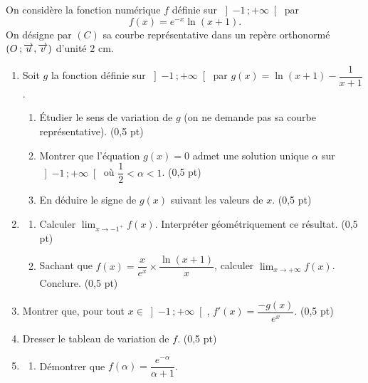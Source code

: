 \begin{commeaubac}
On considère la fonction numérique $f$ définie sur $\left]-1\,;+\infty\right[$
par
\[
  f(x) = e^{-x}\ln(x+1) .
\]
On désigne par $(C)$ sa courbe représentative dans un repère orthonormé
$(O\,;\overrightarrow{u},\overrightarrow{v})$ d'unité $2$ cm.

\begin{enumerate}[label=\textbf{\arabic*.}, leftmargin=*, itemsep=0.3em]
  \item Soit $g$ la fonction définie sur $\left]-1\,;+\infty\right[$ par
        $g(x) = \ln(x+1) - \dfrac{1}{x+1}$.
        \begin{enumerate}[label=\textbf{\alph*)}, leftmargin=1.4em]
          \item Étudier le sens de variation de $g$ (on ne demande pas sa
                courbe représentative). \hfill\textup{(0,5 pt)}
          \item Montrer que l'équation $g(x) = 0$ admet une solution unique
                $\alpha$ sur $\left]-1\,;+\infty\right[$ où
                $\dfrac12 < \alpha < 1$. \hfill\textup{(0,5 pt)}
          \item En déduire le signe de $g(x)$ suivant les valeurs de $x$.
                \hfill\textup{(0,5 pt)}
        \end{enumerate}
  \item \begin{enumerate}[label=\textbf{\alph*)}, leftmargin=1.4em]
          \item Calculer $\lim_{x\to-1^{+}}f(x)$. Interpréter géométriquement
                ce résultat. \hfill\textup{(0,5 pt)}
          \item Sachant que $f(x) = \dfrac{x}{e^{x}}\times\dfrac{\ln(x+1)}{x}$,
                calculer $\lim_{x\to+\infty}f(x)$. Conclure.
                \hfill\textup{(0,5 pt)}
        \end{enumerate}
  \item Montrer que, pour tout $x \in \left]-1\,;+\infty\right[$,
        $f'(x) = \dfrac{-g(x)}{e^{x}}$. \hfill\textup{(0,5 pt)}
  \item Dresser le tableau de variation de $f$. \hfill\textup{(0,5 pt)}
  \item \begin{enumerate}[label=\textbf{\alph*)}, leftmargin=1.4em]
          \item Démontrer que $f(\alpha) = \dfrac{e^{-\alpha}}{\alpha+1}$.

\end{enumerate}
\end{enumerate}
\end{commeaubac}
